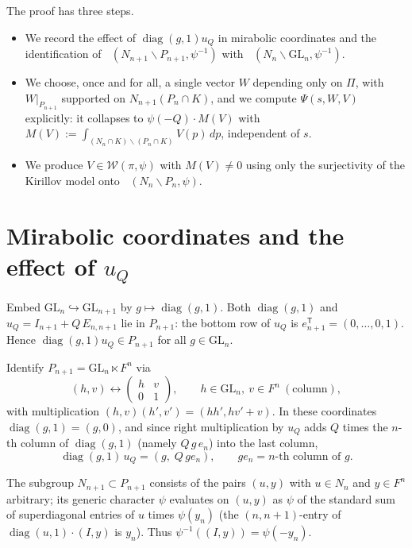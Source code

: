 \documentclass[12pt]{article}
\newcommand{\GL}{\mathrm{GL}}
\newcommand{\Wmod}{\mathcal{W}}
\newcommand{\diag}{\operatorname{diag}}
\DeclareMathOperator{\Cc}{C_c^\infty}
\begin{document}
The proof has three steps.
\begin{itemize}
\item[(A)] We record the effect of $\diag(g,1)u_Q$ in mirabolic coordinates and the
identification of $\Cc(N_{n+1}\backslash P_{n+1},\psi^{-1})$ with
$\Cc(N_n\backslash\GL_n,\psi^{-1})$.
\item[(B)] We choose, once and for all, a single vector $W$ depending only on
$\Pi$, with $W|_{P_{n+1}}$ supported on $N_{n+1}(P_n\cap K)$, and we compute
$\Psi(s,W,V)$ explicitly: it collapses to $\psi(-Q)\cdot M(V)$ with
$M(V):=\int_{(N_n\cap K)\backslash(P_n\cap K)}V(p)\,dp$, independent of $s$.
\item[(C)] We produce $V\in\Wmod(\pi,\psi)$ with $M(V)\neq0$ using only the
surjectivity of the Kirillov model onto $\Cc(N_n\backslash P_n,\psi)$.
\end{itemize}

\section{Mirabolic coordinates and the effect of $u_Q$}
\label{sec:mirabolic}

Embed $\GL_n\hookrightarrow\GL_{n+1}$ by $g\mapsto\diag(g,1)$. Both $\diag(g,1)$
and $u_Q=I_{n+1}+Q\,E_{n,n+1}$ lie in $P_{n+1}$: the bottom row of $u_Q$ is
$e_{n+1}^{\mathsf T}=(0,\dots,0,1)$. Hence $\diag(g,1)u_Q\in P_{n+1}$ for all
$g\in\GL_n$.

Identify $P_{n+1}=\GL_n\ltimes F^n$ via
\[
  (h,v)\longleftrightarrow\begin{pmatrix} h & v\\ 0 & 1\end{pmatrix},
  \qquad h\in\GL_n,\ v\in F^n\ (\text{column}),
\]
with multiplication $(h,v)(h',v')=(hh',hv'+v)$. In these coordinates
$\diag(g,1)=(g,0)$, and since right multiplication by $u_Q$ adds $Q$ times the
$n$-th column of $\diag(g,1)$ (namely $Q\,g\,e_n$) into the last column,
\begin{equation}\label{eq:uQ}
  \diag(g,1)\,u_Q=(g,\;Q\,g e_n),\qquad g e_n=\text{$n$-th column of }g.
\end{equation}

The subgroup $N_{n+1}\subset P_{n+1}$ consists of the pairs $(u,y)$ with $u\in N_n$
and $y\in F^n$ arbitrary; its generic character $\psi$ evaluates on $(u,y)$ as
$\psi$ of the standard sum of superdiagonal entries of $u$ times $\psi(y_n)$
(the $(n,n+1)$-entry of $\diag(u,1)\cdot(I,y)$ is $y_n$). Thus
$\psi^{-1}((I,y))=\psi(-y_n)$.
\end{document}
